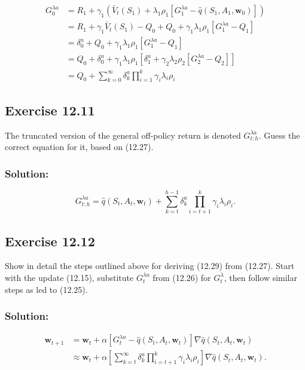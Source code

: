 \begin{align*}
    G_0^{\lambda a} &= R_{1} + \gamma_{1} \left( \bar{V}_t(S_{1}) + \lambda_{1} \rho_{1} \left[ G_{1}^{\lambda a} - \hat{q}(S_{1}, A_{1}, \mathbf{w}_0) \right] \right) \\
    &= R_{1} + \gamma_{1}  \bar{V}_t(S_{1}) - Q_0 + Q_0 + \gamma_{1}  \lambda_{1} \rho_{1} \left[ G_{1}^{\lambda a} - Q_1 \right] \\
    &= \delta_0^a + Q_0 + \gamma_{1}  \lambda_{1} \rho_{1} \left[ G_{1}^{\lambda a} - Q_1 \right] \\
    &= Q_0 + \delta_0^a + \gamma_{1}  \lambda_{1} \rho_{1} \left[ \delta_1^a + \gamma_{2} \lambda_{2} \rho_{2} \left[ G_{2}^{\lambda a} - Q_2 \right] \right] \\
    &= Q_0 + \sum_{k=0}^{\infty} \delta_k^a \prod_{i=1}^{k} \gamma_i \lambda_i \rho_i
\end{align*}

\subsection*{Exercise 12.11}
The truncated version of the general off-policy return is denoted $G_{t:h}^{\lambda a}$.
Guess the correct equation for it, based on (12.27).

\subsubsection*{Solution:}

\[
    G_{t:h}^{\lambda a} = \hat{q}(S_t, A_t, \mathbf{w}_t) + \sum_{k=t}^{h-1} \delta_k^a \prod_{i=t+1}^{k} \gamma_i \lambda_i \rho_i.
\]


\subsection*{Exercise 12.12}
Show in detail the steps outlined above for deriving (12.29) from (12.27).
Start with the update (12.15), substitute $G_t^{\lambda a}$ from (12.26) for $G_t^\lambda$, then follow similar
steps as led to (12.25). 

\subsubsection*{Solution:}

\begin{align*}
    \mathbf{w}_{t+1} &= \mathbf{w}_t + \alpha \left[ G_t^{\lambda a} - \hat{q}(S_t, A_t, \mathbf{w}_t) \right] \nabla \hat{q}(S_t, A_t, \mathbf{w}_t) \\
    &\approx \mathbf{w}_t + \alpha \left[ \sum_{k=t}^{\infty} \delta_k^a \prod_{i=t+1}^{k} \gamma_i \lambda_i \rho_i  \right] \nabla \hat{q}(S_t, A_t, \mathbf{w}_t).
\end{align*}

